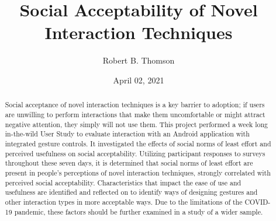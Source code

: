 \documentclass{l4proj}
\begin{document}
\title{Social Acceptability of Novel Interaction Techniques}
\author{Robert B. Thomson}
\date{April 02, 2021}

\maketitle

\begin{abstract}
    Social acceptance of novel interaction techniques is a key barrier to adoption; if users are unwilling to perform interactions that make them uncomfortable or might attract negative attention, they simply will not use them. This project  performed a week long in-the-wild User Study to evaluate interaction with an Android application with integrated gesture controls. It investigated the effects of social norms of least effort and perceived usefulness on social acceptability. Utilizing participant responses to surveys throughout these seven days, it is determined that social norms of least effort are present in people's perceptions of novel interaction techniques, strongly correlated with perceived social acceptability. Characteristics that impact the ease of use and usefulness are identified and reflected on to identify ways of designing gestures and other interaction types in more acceptable ways. Due to the limitations of the COVID-19 pandemic, these factors should be further examined in a study of a wider sample.
\end{abstract}


%
%
\def\consentname {Robert Borland Thomson} %
\def\consentdate {02 April 2021} %
%
\educationalconsent
\end{document}
